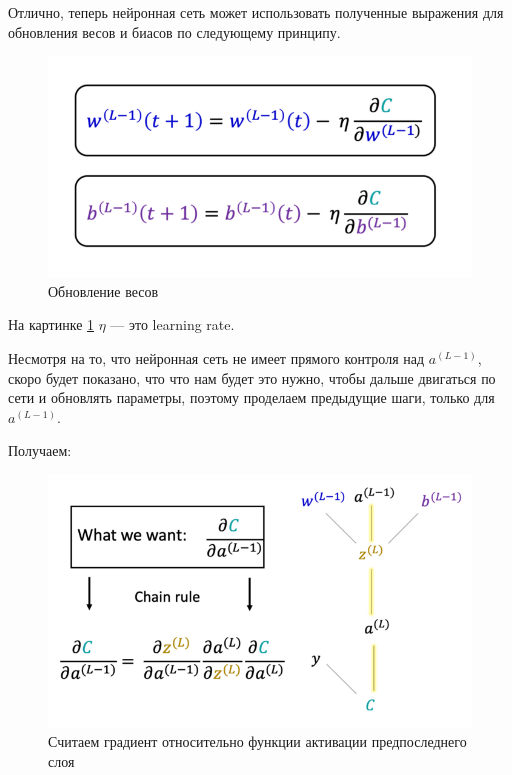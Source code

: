 \documentclass[a4paper, 10pt, openany]{book} %
\begin{document}
	Отлично, теперь нейронная сеть может использовать полученные выражения для обновления весов и биасов по следующему принципу.

	\begin{figure}[h!]
		\centering
		\includegraphics[width=\linewidth]{pictures/backpropagation/updating.png}
		\caption{Обновление весов}
		\label{updating}
	\end{figure}

	На картинке \ref{updating} $\eta$ --- это learning rate.
	
	Несмотря на то, что нейронная сеть не имеет прямого контроля над $a^{(L-1)}$, скоро будет показано, что что нам будет это нужно, чтобы дальше двигаться по сети и обновлять параметры, поэтому проделаем предыдущие шаги, только для $a^{(L-1)}$.
	
	Получаем:
	
	\begin{figure}[h!]
		\centering
		\includegraphics[width=\linewidth]{pictures/backpropagation/last_activation.png}
		\caption{Считаем градиент относительно функции активации предпоследнего слоя}
		\label{last_activation}
	\end{figure}
\end{document}
